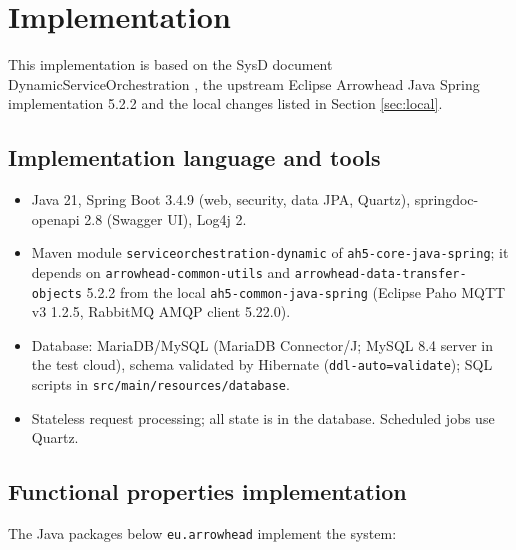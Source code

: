 \documentclass[a4paper]{arrowhead}
\begin{document}
\newpage

\section{Implementation}
\label{Implementation}

This implementation is based on the SysD document DynamicServiceOrchestration \cite{dso-sysd}, the upstream Eclipse Arrowhead Java Spring implementation 5.2.2 \cite{ah5java} and the local changes listed in Section \ref{sec:local}.

\subsection{Implementation language and tools}
\begin{itemize}
\item Java 21, Spring Boot 3.4.9 (web, security, data JPA, Quartz), springdoc-openapi 2.8 (Swagger UI), Log4j 2.
\item Maven module \texttt{serviceorchestration-dynamic} of \texttt{ah5-core-java-spring}; it depends on \texttt{arrowhead-common-utils} and \texttt{arrowhead-data-transfer-objects} 5.2.2 from the local \texttt{ah5-common-java-spring} (Eclipse Paho MQTT v3 1.2.5, RabbitMQ AMQP client 5.22.0).
\item Database: MariaDB/MySQL (MariaDB Connector/J; MySQL 8.4 server in the test cloud), schema validated by Hibernate (\texttt{ddl-auto=validate}); SQL scripts in \texttt{src/main/resources/database}.
\item Stateless request processing; all state is in the database. Scheduled jobs use Quartz.
\end{itemize}

\subsection{Functional properties implementation}

The Java packages below \texttt{eu.arrowhead} implement the system:
\end{document}

